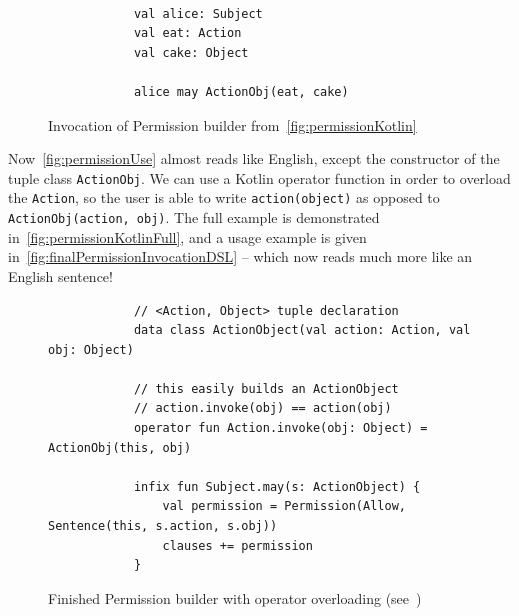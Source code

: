 \begin{figure}[h]
    \centering
    \begin{minipage}{0.5\textwidth}
        \begin{verbatim}

            val alice: Subject
            val eat: Action
            val cake: Object

            alice may ActionObj(eat, cake)
        \end{verbatim}
    \end{minipage}
    \caption{Invocation of Permission builder from~\autoref{fig:permissionKotlin}}
    \label{fig:permissionUse}
\end{figure}

Now~\autoref{fig:permissionUse} almost reads like English, except the constructor of the tuple class \texttt{ActionObj}.
We can use a Kotlin operator function in order to overload the \texttt{Action}, so the user is able to write \texttt{action(object)} as opposed to \texttt{ActionObj(action, obj)}.
The full example is demonstrated in~\autoref{fig:permissionKotlinFull}, and a usage example is given in~\autoref{fig:finalPermissionInvocationDSL} -- which now reads much more like an English sentence!


\begin{figure}[h]
    \centering
    \begin{minipage}{\textwidth}
        \begin{verbatim}
            // <Action, Object> tuple declaration
            data class ActionObject(val action: Action, val obj: Object)

            // this easily builds an ActionObject
            // action.invoke(obj) == action(obj)
            operator fun Action.invoke(obj: Object) = ActionObj(this, obj)

            infix fun Subject.may(s: ActionObject) {
                val permission = Permission(Allow, Sentence(this, s.action, s.obj))
                clauses += permission
            }
        \end{verbatim}
    \end{minipage}
    \caption[Finished Permission builder]{Finished Permission builder with operator overloading (see~\cite{kotlinInvokeOperator})}
    \label{fig:permissionKotlinFull}
\end{figure}



